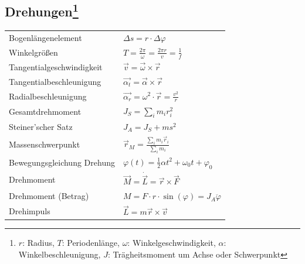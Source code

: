 \documentclass[12pt,a4paper]{article}
\renewcommand{\=}[1]{\stackrel{#1}{=}}
\theoremstyle{definition}
\theoremstyle{remark}
\begin{document}
\subsection[Drehungen]{Drehungen\let\thefootnote\relax\footnote{$r$: Radius, $T$: Periodenlänge, $\omega$: Winkelgeschwindigkeit, $\alpha$: Winkelbeschleunigung, $J$: Trägheitsmoment um Achse oder Schwerpunkt}}

\begin{center}
\begin{minipage}[t]{.6\linewidth}
\vspace{0pt}
\begin{tabular}{ll}
Bogenlängenelement & $\Delta s = r \cdot \Delta \varphi$\\
Winkelgrößen & $T = \frac{2 \pi}{\omega} = \frac{2 \pi r}{v} = \frac{1}{f}$\\
Tangentialgeschwindigkeit & $\vec{v} = \vec{\omega} \times \vec{r}$\\
Tangentialbeschleunigung & $\vec{\alpha_t} = \vec{\alpha} \times \vec{r}$\\
Radialbeschleunigung & $\vec{\alpha_r} = \omega^2 \cdot \vec{r} = \frac{v^2}{r}$\\
Gesamtdrehmoment & $J_S = \sum_i m_i r^2_i$\\
Steiner'scher Satz & $J_A = J_S + m s^2$\\
Massenschwerpunkt & $\vec{r}_M = \frac{\sum_i m_i \vec{r}_i}{\sum_i m_i}$\\
Bewegungsgleichung Drehung & $\varphi(t) = \frac{1}{2} \alpha t^2 + \omega_0 t + \varphi_0$\\
Drehmoment & $\vec{M} = \dot{\vec{L}} = \vec{r} \times \vec{F}$\\
Drehmoment (Betrag) & $M = F \cdot r \cdot \sin(\varphi) = J_A \ddot{\varphi}$\\
Drehimpuls & $\vec{L} = m \vec{r} \times \vec{v}$\\


\end{tabular}
\end{minipage}
\end{center}
\end{document}
